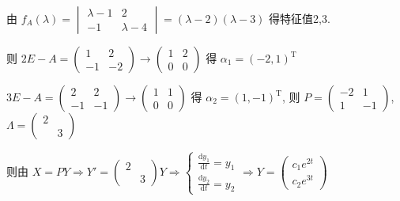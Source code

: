 \begin{enumerate}
			       由 \( f_{A}(\lambda) = \begin{vmatrix}
				       \lambda-1 & 2         \\
				       -1        & \lambda-4
			       \end{vmatrix} = (\lambda-2)(\lambda-3) \) 得特征值2,3.

			       则 \( 2E-A = \begin{pmatrix}
				       1  & 2  \\
				       -1 & -2
			       \end{pmatrix} \rightarrow \begin{pmatrix}
				       1 & 2 \\
				       0 & 0
			       \end{pmatrix} \) 得 \( \alpha_{1} = (-2, 1)^{\mathrm{T}} \)

			       \( 3E-A = \begin{pmatrix}
				       2  & 2  \\
				       -1 & -1
			       \end{pmatrix} \rightarrow \begin{pmatrix}
				       1 & 1 \\
				       0 & 0
			       \end{pmatrix} \) 得 \( \alpha_{2} = (1, -1)^{\mathrm{T}} \), 则 \( P = \begin{pmatrix}
				       -2 & 1  \\
				       1  & -1
			       \end{pmatrix} \), \( \Lambda = \begin{pmatrix}
				       2 &   \\
				         & 3
			       \end{pmatrix} \)

			       则由 \( X = P Y \Rightarrow Y' = \begin{pmatrix}
				       2 &   \\
				         & 3
			       \end{pmatrix} Y \Rightarrow \begin{cases}
				       \frac{\mathrm{d}y_{1}}{\mathrm{d}t} = y_{1} \\
				       \frac{\mathrm{d}y_{2}}{\mathrm{d}t} = y_{2}
			       \end{cases} \Rightarrow Y = \begin{pmatrix}
				       c_{1}e^{2t} \\
				       c_{2}e^{3t}
			       \end{pmatrix} \)


\end{enumerate}

